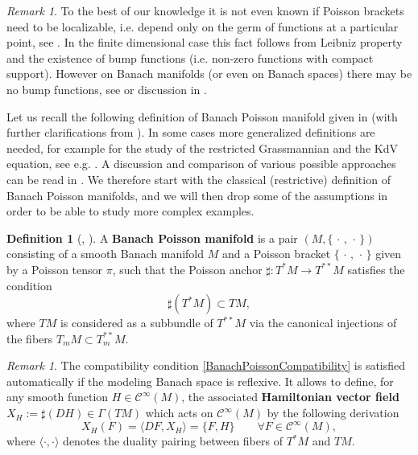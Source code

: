 \documentclass[a4paper,12pt,reqno]{amsart}%
\theoremstyle{definition}
\newtheorem{definition}[theorem]{Definition}
\theoremstyle{remark}
\newtheorem{remark}[theorem]{Remark}
\numberwithin{theorem}{section}
\numberwithin{equation}{section}
\newcommand{\1}{{\bf 1}}
\newcommand{\pb}{\{\,\cdot\,,\,\cdot\,\}}
\newcommand{\Cp}{\mathscr{C}}
\begin{document}
\begin{remark}
To the best of our knowledge it is not even known if
Poisson brackets need to be localizable, i.e. depend only on the germ of functions at a particular point, see \cite{BGT}. In the finite dimensional case this fact follows from Leibniz property and the existence of bump functions (i.e. non-zero functions with compact support). However on Banach manifolds (or even on Banach spaces) there may be no bump functions, see \cite{kurzweil1954,bonic-frampton1966} or discussion in \cite{pelletier}.
\end{remark}

Let us recall the following definition of Banach Poisson manifold given in \cite{OR} (with further clarifications from \cite{BGT}). In some cases more generalized definitions are needed, for example for the study of the restricted Grassmannian and the KdV equation, see e.g. \cite{tumpach-bruhat,pelletier,neeb14}. A discussion and comparison of various possible approaches can be read in \cite{GRT-poisson-bial}. We therefore start with the classical (restrictive) definition of Banach Poisson manifolds, and we will then drop some of the assumptions in order to be able to study more complex examples.
\begin{definition}[\cite{OR}, \cite{BGT}]\label{def:poissonmanifold}
A \textbf{Banach Poisson manifold} is a pair $(M, \pb)$ consisting of a smooth Banach manifold $M$ and a Poisson bracket $\pb$ given by a Poisson tensor $\pi$, such that 
the Poisson anchor $\sharp:T^*M \longrightarrow T^{**}M$ satisfies the condition 
\begin{equation}\label{BanachPoissonCompatibility}
\sharp(T^{*}M) \subset TM,
\end{equation}
where $TM$ is considered as a subbundle of $T^{**}M$ via the canonical injections of the fibers $T_mM\subset T_m^{**}M$.
\end{definition}

\begin{remark}
The compatibility condition \eqref{BanachPoissonCompatibility} is satisfied automatically if the modeling Banach space is reflexive. It allows to define, for any smooth function $H\in\Cp^{\infty}(M)$, the associated \textbf{Hamiltonian vector field} $X_{H}:= \sharp(DH) \in \Gamma(TM)$ which acts on $\Cp^{\infty}(M)$ by the following derivation
\[
X_H(F) = \langle DF, X_H \rangle = \{ F, H\} \quad\quad \forall F\in\Cp^{\infty}(M),
\]
where $ \langle \cdot,\cdot \rangle$ denotes the duality pairing  between fibers of $T^*M$ and $TM$.
\end{remark}
\end{document}
